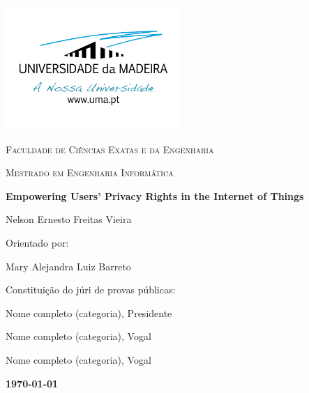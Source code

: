 %
%
\begin{titlepage}
    \centering
    \addtolength{\hoffset}{0.5cm}
        \centering
        \includegraphics[width=0.50\textwidth]{assets/images/uma_logo.png}\par\vspace{0.5cm}
        {\scshape\LARGE {} Faculdade de Ciências Exatas e da Engenharia \par}
        \vspace{1cm}
        {\scshape\Large Mestrado em Engenharia Informática \par}
        \vspace{1.5cm}
        {\huge\bfseries Empowering Users' Privacy Rights in the Internet of Things \par}
        \vspace{2cm}
        {\Large Nelson Ernesto Freitas Vieira\par}
        \vfill
        {\large Orientado por: \par}
            Mary Alejandra Luiz Barreto\par
        \vfill
        {\large Constituição do júri de provas públicas: \par}
            Nome completo (categoria), Presidente \par
            Nome completo (categoria), Vogal \par
            Nome completo (categoria), Vogal \par
        \vfill
        {\large \bfseries \today \par}
    \end{titlepage}
